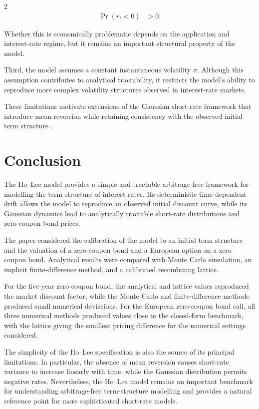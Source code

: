 \documentclass[10pt,a4paper]{article}
\numberwithin{equation}{section}
\begin{document}
\begin{multicols}{2}
\begin{align*}
    \Pr(r_t<0)
    &>
    0.
\end{align*}

Whether this is economically problematic depends on the application and
interest-rate regime, but it remains an important structural property of
the model.

Third, the model assumes a constant instantaneous volatility $\sigma$.
Although this assumption contributes to analytical tractability, it
restricts the model's ability to reproduce more complex volatility
structures observed in interest-rate markets.

These limitations motivate extensions of the Gaussian short-rate
framework that introduce mean reversion while retaining consistency with
the observed initial term structure \citep{BrigoMercurio2006}.

\section{Conclusion}

The Ho--Lee model provides a simple and tractable arbitrage-free
framework for modelling the term structure of interest rates. Its
deterministic time-dependent drift allows the model to reproduce an
observed initial discount curve, while its Gaussian dynamics lead to
analytically tractable short-rate distributions and zero-coupon bond
prices.

The paper considered the calibration of the model to an initial term
structure and the valuation of a zero-coupon bond and a European option
on a zero-coupon bond. Analytical results were compared with Monte Carlo
simulation, an implicit finite-difference method, and a calibrated
recombining lattice.

For the five-year zero-coupon bond, the analytical and lattice values
reproduced the market discount factor, while the Monte Carlo and
finite-difference methods produced small numerical deviations. For the
European zero-coupon bond call, all three numerical methods produced
values close to the closed-form benchmark, with the lattice giving the
smallest pricing difference for the numerical settings considered.

The simplicity of the Ho--Lee specification is also the source of its
principal limitations. In particular, the absence of mean reversion
causes short-rate variance to increase linearly with time, while the
Gaussian distribution permits negative rates. Nevertheless, the
Ho--Lee model remains an important benchmark for understanding
arbitrage-free term-structure modelling and provides a natural reference
point for more sophisticated short-rate models.

\end{multicols}



\end{document}
